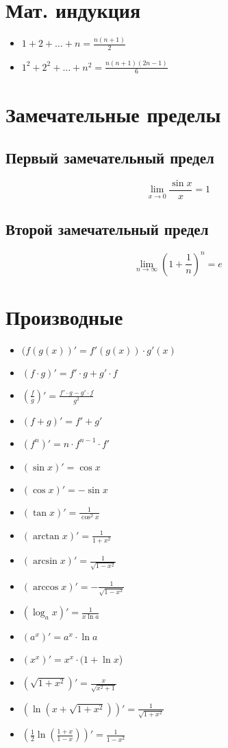 \documentclass{article}
\begin{document}
    \section{Мат. индукция}
    \begin{itemize}
	\item $1 + 2 + \dots + n = \frac{n(n+1)}{2}$
	\item $1^2 + 2^2 + \dots + n^2 = \frac{n(n+1)(2n-1)}{6} $	
    \end{itemize}
    \section{Замечательные пределы}
    \subsection{Первый замечательный предел}
    $$ \lim_{x \to 0} \frac{\sin{x}}{x} = 1 $$
    \subsection{Второй замечательный предел}
    $$ \lim_{n \to \infty} \left(1 + \frac{1}{n} \right)^n = e $$

    \section{Производные}
    \begin{itemize}
	\item $(f(g(x))' = f'(g(x)) \cdot g'(x)$
	\item $(f \cdot g)' = f' \cdot g + g' \cdot f$
	\item $\left( \frac{f}{g} \right)' = \frac{f' \cdot g -g' \cdot f}{g^2}$
	\item $(f + g)' = f' + g'$
	\item $(f^n)' = n \cdot f^{n-1} \cdot f'$
	\item $(\sin{x} )' = \cos{x}$
	\item $(\cos{x} )' = - \sin{x}$
	\item $( \tan{x} )' = \frac{1}{\cos^2{x}}$
	\item $(\arctan x)' = \frac{1}{1+x^2}$
	\item $(\arcsin x)' = \frac{1}{\sqrt{1-x^2}}$
	\item $(\arccos x)' = -\frac{1}{\sqrt{1-x^2}}$
	\item $(\log_a{x})' = \frac{1}{x\ln{a}}$
	\item $(a^x)'= a^x \cdot \ln{a}$
	\item $(x^x)'=x^x \cdot ( 1+ \ln{x}$)
	\item $(\sqrt{1+x^2})' = \frac{x}{\sqrt{x^2+1}}$
	\item $(\ln(x+\sqrt{1+x^2}))'=\frac{1}{\sqrt{1+x^2}}$
	\item $\left(\frac{1}{2}\ln\left(\frac{1+x}{1-x}\right)\right)' = \frac{1}{1-x^2}$
	\end{itemize}
\end{document}

